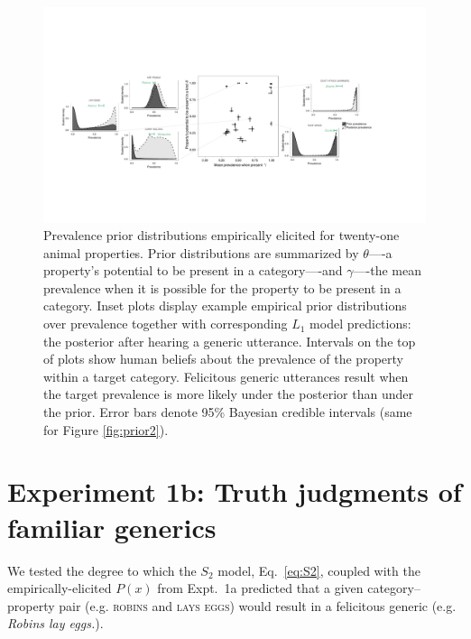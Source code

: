\documentclass[10pt,letterpaper]{article}
\newcommand{\ndg}[1]{\textcolor{Green}{[ndg: #1]}}
\begin{document}
%
\begin{figure}
\centering
    \includegraphics[width=\columnwidth]{prevalence-scatter-wDists_wide.pdf}
    \caption{Prevalence prior distributions empirically elicited for twenty-one animal properties.
    Prior distributions are summarized by $\theta$----a property's potential to be present in a category----and $\gamma$----the mean prevalence when it is possible for the property to be present in a category.
    Inset plots display example empirical prior distributions over prevalence together with corresponding $L_1$ model predictions: the posterior after hearing a generic utterance. 
    Intervals on the top of plots show human beliefs about the prevalence of the property within a target category.
    Felicitous generic utterances result when the target prevalence is more likely under the posterior than under the prior.
     Error bars denote 95\% Bayesian credible intervals (same for Figure \ref{fig:prior2}).
    }
  \label{fig:priors1a}
\end{figure}




\section*{Experiment 1b: Truth judgments of familiar generics}


We tested the degree to which the $S_2$ model, Eq.~\ref{eq:S2}, coupled with the empirically-elicited $P(x)$ from Expt.~1a predicted that a given category--property pair (e.g. \textsc{robins} and \textsc{lays eggs}) would result in a felicitous generic (e.g. \emph{Robins lay eggs.}). 
\end{document}
